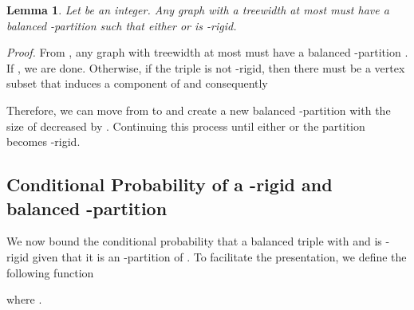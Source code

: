 \documentclass[11pt]{article}
\newtheorem{lemma}{Lemma}[section]
\providecommand{\qed}{\hfill }
\newenvironment{proof}[0]{\textit{Proof.} }{\hfill  \qed}
\begin{document}
\begin{lemma}
\label{treewidth-partition-lem}
Let   be an integer.
Any graph with a treewidth at most  must have a balanced -partition 
 such that either  or
 is -rigid. 
\end{lemma}
\begin{proof}
From \cite{kloks94}, any graph with treewidth at most  must have
a balanced -partition . If , we are done. Otherwise, if the triple  is not -rigid, then there must be a vertex subset  that induces a component of  and consequently 

Therefore, we can move  from  to  and create a new balanced -partition
with the size of  decreased by .
Continuing this process until either  or 
the partition becomes -rigid. 
\end{proof}

\subsection{Conditional Probability of a -rigid and balanced -partition}

We now bound the conditional probability that a balanced triple 
with  and  is -rigid given that it is an 
-partition of .
To facilitate the presentation,  we define the following function

where .
\end{document}
